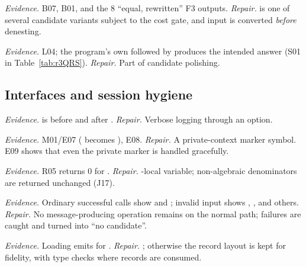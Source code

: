 \emph{Evidence.} B07, B01, and the 8 ``equal, rewritten'' F3 outputs.
\emph{Repair.}  is one of several candidate variants subject to
the cost gate, and  input is converted \emph{before} denesting.

\emph{Evidence.} L04; the program's own  followed
by  produces the intended answer (S01 in
Table~\ref{tab:r3QRS}). \emph{Repair.} Part of candidate polishing.

\subsection{Interfaces and session hygiene}

\emph{Evidence.}  is  before and
\code{{}} after . \emph{Repair.} Verbose logging through an option.

\emph{Evidence.} M01/E07 ( becomes ), E08. \emph{Repair.} A
private-context marker symbol. E09 shows that even the private marker is
handled gracefully.

\emph{Evidence.} R05 returns 0 for . \emph{Repair.}
-local variable; non-algebraic denominators are returned
unchanged (J17).

\emph{Evidence.} Ordinary successful calls show  and
; invalid input shows ,
, and others. \emph{Repair.} No message-producing operation
remains on the normal path; failures are caught and turned into ``no
candidate''.

\emph{Evidence.} Loading emits  for . \emph{Repair.}
; otherwise the record layout is kept for
fidelity, with type checks where records are consumed.


